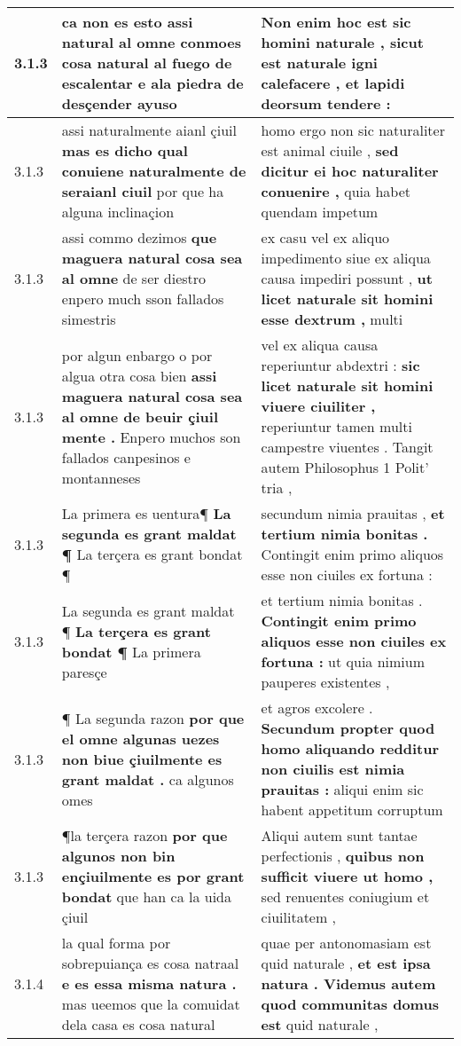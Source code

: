 \begin{tabular}{|p{1cm}|p{6.5cm}|p{6.5cm}|}
3.1.3 & ca non es esto \textbf{ assi natural al omne conmoes cosa natural al fuego de escalentar } e ala piedra de desçender ayuso & Non enim hoc est sic homini naturale , \textbf{ sicut est naturale igni calefacere , } et lapidi deorsum tendere : \\\hline
3.1.3 & assi naturalmente aianl çiuil \textbf{ mas es dicho qual conuiene naturalmente de seraianl ciuil } por que ha alguna inclinaçion & homo ergo non sic naturaliter est animal ciuile , \textbf{ sed dicitur ei hoc naturaliter conuenire , } quia habet quendam impetum \\\hline
3.1.3 & assi commo dezimos \textbf{ que maguera natural cosa sea al omne } de ser diestro enpero much sson fallados simestris & ex casu vel ex aliquo impedimento siue ex aliqua causa impediri possunt , \textbf{ ut licet naturale sit homini esse dextrum , } multi \\\hline
3.1.3 & por algun enbargo o por algua otra cosa bien \textbf{ assi maguera natural cosa sea al omne de beuir çiuil mente . } Enpero muchos son fallados canpesinos e montanneses & vel ex aliqua causa reperiuntur abdextri : \textbf{ sic licet naturale sit homini viuere ciuiliter , } reperiuntur tamen multi campestre viuentes . Tangit autem Philosophus 1 Polit’ tria , \\\hline
3.1.3 & La primera es uentura¶ \textbf{ La segunda es grant maldat ¶ } La terçera es grant bondat ¶ & secundum nimia prauitas , \textbf{ et tertium nimia bonitas . } Contingit enim primo aliquos esse non ciuiles ex fortuna : \\\hline
3.1.3 & La segunda es grant maldat ¶ \textbf{ La terçera es grant bondat ¶ } La primera paresçe & et tertium nimia bonitas . \textbf{ Contingit enim primo aliquos esse non ciuiles ex fortuna : } ut quia nimium pauperes existentes , \\\hline
3.1.3 & ¶ La segunda razon \textbf{ por que el omne algunas uezes non biue çiuilmente es grant maldat . } ca algunos omes & et agros excolere . \textbf{ Secundum propter quod homo aliquando redditur non ciuilis est nimia prauitas : } aliqui enim sic habent appetitum corruptum \\\hline
3.1.3 & ¶la terçera razon \textbf{ por que algunos non bin ençiuilmente es por grant bondat } que han ca la uida çiuil & Aliqui autem sunt tantae perfectionis , \textbf{ quibus non sufficit viuere ut homo , } sed renuentes coniugium et ciuilitatem , \\\hline
3.1.4 & la qual forma por sobrepuiança es cosa natraal \textbf{ e es essa misma natura . } mas ueemos que la comuidat dela casa es cosa natural & quae per antonomasiam est quid naturale , \textbf{ et est ipsa natura . Videmus autem quod communitas domus est } quid naturale , \\\hline

\end{tabular}
